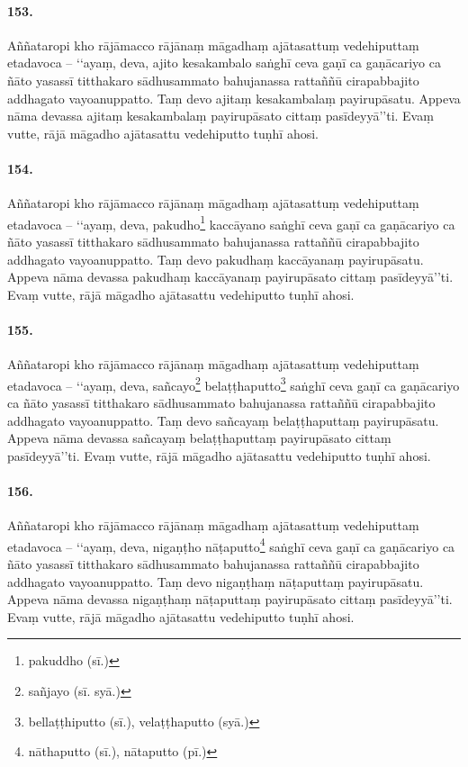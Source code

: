 \paragraph{153.} Aññataropi kho rājāmacco rājānaṃ māgadhaṃ ajātasattuṃ vedehiputtaṃ etadavoca – ‘‘ayaṃ, deva, ajito kesakambalo saṅghī ceva gaṇī ca gaṇācariyo ca ñāto yasassī titthakaro sādhusammato bahujanassa rattaññū cirapabbajito addhagato vayoanuppatto. Taṃ devo ajitaṃ kesakambalaṃ payirupāsatu. Appeva nāma devassa ajitaṃ kesakambalaṃ payirupāsato cittaṃ pasīdeyyā’’ti. Evaṃ vutte, rājā māgadho ajātasattu vedehiputto tuṇhī ahosi.

\paragraph{154.} Aññataropi kho rājāmacco rājānaṃ māgadhaṃ ajātasattuṃ vedehiputtaṃ etadavoca – ‘‘ayaṃ, deva, pakudho\footnote{pakuddho (sī.)} kaccāyano saṅghī ceva gaṇī ca gaṇācariyo ca ñāto yasassī titthakaro sādhusammato bahujanassa rattaññū cirapabbajito addhagato vayoanuppatto. Taṃ devo pakudhaṃ kaccāyanaṃ payirupāsatu. Appeva nāma devassa pakudhaṃ kaccāyanaṃ payirupāsato cittaṃ pasīdeyyā’’ti. Evaṃ vutte, rājā māgadho ajātasattu vedehiputto tuṇhī ahosi.

\paragraph{155.} Aññataropi kho rājāmacco rājānaṃ māgadhaṃ ajātasattuṃ vedehiputtaṃ etadavoca – ‘‘ayaṃ, deva, sañcayo\footnote{sañjayo (sī. syā.)} belaṭṭhaputto\footnote{bellaṭṭhiputto (sī.), velaṭṭhaputto (syā.)} saṅghī ceva gaṇī ca gaṇācariyo ca ñāto yasassī titthakaro sādhusammato bahujanassa rattaññū cirapabbajito addhagato vayoanuppatto. Taṃ devo sañcayaṃ belaṭṭhaputtaṃ payirupāsatu. Appeva nāma devassa sañcayaṃ belaṭṭhaputtaṃ payirupāsato cittaṃ pasīdeyyā’’ti. Evaṃ vutte, rājā māgadho ajātasattu vedehiputto tuṇhī ahosi.

\paragraph{156.} Aññataropi kho rājāmacco rājānaṃ māgadhaṃ ajātasattuṃ vedehiputtaṃ etadavoca – ‘‘ayaṃ, deva, nigaṇṭho nāṭaputto\footnote{nāthaputto (sī.), nātaputto (pī.)} saṅghī ceva gaṇī ca gaṇācariyo ca ñāto yasassī titthakaro sādhusammato bahujanassa rattaññū cirapabbajito addhagato vayoanuppatto. Taṃ devo nigaṇṭhaṃ nāṭaputtaṃ payirupāsatu. Appeva nāma devassa nigaṇṭhaṃ nāṭaputtaṃ payirupāsato cittaṃ pasīdeyyā’’ti. Evaṃ vutte, rājā māgadho ajātasattu vedehiputto tuṇhī ahosi.

